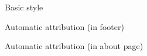 \documentclass[10pt]{beamer}
\begin{document}
\begin{frame}[fragile]{Basic style}
\vfill{}\vfill
\end{frame}


\begin{frame}[fragile]{Automatic attribution (in footer)}
\vfill{}\vfill
\end{frame}


\begin{frame}[fragile]{Automatic attribution (in about page)}
\vfill{}\vfill
\end{frame}
\end{document}
